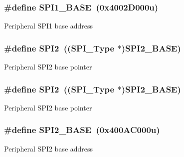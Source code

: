 \subsubsection[{\texorpdfstring{S\+P\+I1\+\_\+\+B\+A\+SE}{SPI1_BASE}}]{\setlength{\rightskip}{0pt plus 5cm}\#define S\+P\+I1\+\_\+\+B\+A\+SE~(0x4002\+D000u)}\hypertarget{group__SPI__Peripheral__Access__Layer_ga50cd8b47929f18b05efbd0f41253bf8d}{}\label{group__SPI__Peripheral__Access__Layer_ga50cd8b47929f18b05efbd0f41253bf8d}
Peripheral S\+P\+I1 base address 
\subsubsection[{\texorpdfstring{S\+P\+I2}{SPI2}}]{\setlength{\rightskip}{0pt plus 5cm}\#define S\+P\+I2~(({\bf S\+P\+I\+\_\+\+Type} $\ast$){\bf S\+P\+I2\+\_\+\+B\+A\+SE})}\hypertarget{group__SPI__Peripheral__Access__Layer_gaf2c3d8ce359dcfbb2261e07ed42af72b}{}\label{group__SPI__Peripheral__Access__Layer_gaf2c3d8ce359dcfbb2261e07ed42af72b}
Peripheral S\+P\+I2 base pointer 
\subsubsection[{\texorpdfstring{S\+P\+I2}{SPI2}}]{\setlength{\rightskip}{0pt plus 5cm}\#define S\+P\+I2~(({\bf S\+P\+I\+\_\+\+Type} $\ast$){\bf S\+P\+I2\+\_\+\+B\+A\+SE})}\hypertarget{group__SPI__Peripheral__Access__Layer_gaf2c3d8ce359dcfbb2261e07ed42af72b}{}\label{group__SPI__Peripheral__Access__Layer_gaf2c3d8ce359dcfbb2261e07ed42af72b}
Peripheral S\+P\+I2 base pointer 
\subsubsection[{\texorpdfstring{S\+P\+I2\+\_\+\+B\+A\+SE}{SPI2_BASE}}]{\setlength{\rightskip}{0pt plus 5cm}\#define S\+P\+I2\+\_\+\+B\+A\+SE~(0x400\+A\+C000u)}\hypertarget{group__SPI__Peripheral__Access__Layer_gac3e357b4c25106ed375fb1affab6bb86}{}\label{group__SPI__Peripheral__Access__Layer_gac3e357b4c25106ed375fb1affab6bb86}
Peripheral S\+P\+I2 base address 
